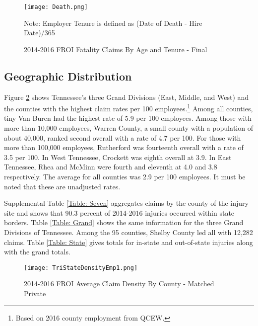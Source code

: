 \documentclass[9pt, oneside]{article}   	%
\begin{document}
\begin{figure}[htp]
\caption{2014-2016 FROI Fatality Claims By Age and Tenure - Final}
\hspace{0.1in}

\label{Fig: Death}
\begin{center}
\texttt{[image: Death.png]}
\end{center}
\small
\begin{center}
Note: Employer Tenure is defined as (Date of Death - Hire Date)/365
\end{center}
\end{figure}


\pagebreak









\subsection{Geographic Distribution}    


Figure \ref{Fig: TriState} shows Tennessee's three Grand Divisions (East, Middle, and West) and the counties with the highest claim rates per 100 employees.\footnote{Based on 2016 county employment from QCEW.}  Among all counties, tiny Van Buren had the highest rate of 5.9 per 100 employees. Among those with more than 10,000 employees, Warren County, a small county with a population of about 40,000, ranked second overall with a rate of 4.7 per 100.  For those with more than 100,000 employees, Rutherford was fourteenth overall with a rate of 3.5 per 100. In West Tennessee, Crockett was eighth overall at 3.9.  In East Tennessee, Rhea and McMinn were fourth and eleventh at 4.0 and 3.8 respectively. The average for all counties was 2.9 per 100 employees. It must be noted that these are unadjusted rates.

Supplemental Table \ref{Table: Seven} aggregates claims by the county of the injury site and shows that 90.3 percent of 2014-2016 injuries occurred within state borders.  Table \ref{Table: Grand} shows the same information for the three Grand Divisions of Tennessee. Among the 95 counties, Shelby County led all with 12,282 claims. Table \ref{Table: State} gives totals for in-state and out-of-state injuries along with the grand totals.

\begin{figure}[htp]
\caption{2014-2016 FROI Average Claim Density By County - Matched Private}\begin{center}

\texttt{[image: TriStateDensityEmp1.png]}
\label{Fig: TriState}
\end{center}
\end{figure}
\end{document}
